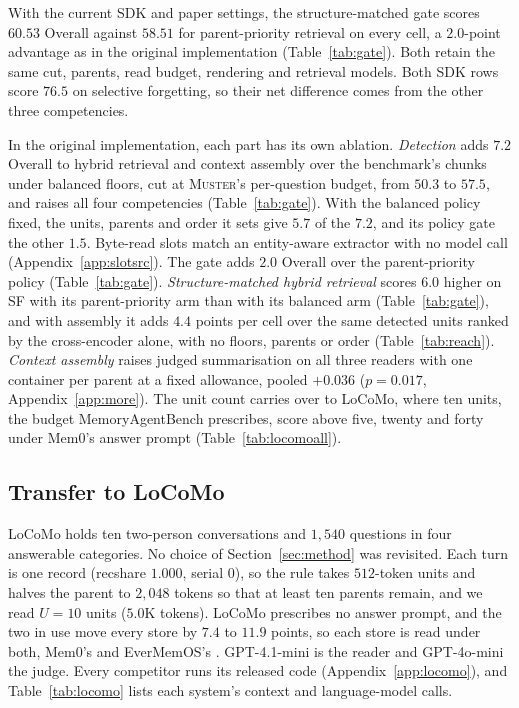 \documentclass{article}
\newcommand{\sys}{\textsc{Muster}}
\newcommand{\serial}{\textsf{serial}}
\newcommand{\cov}{\textsf{recshare}}
\begin{document}
With the current SDK and paper settings, the structure-matched gate scores $60.53$ Overall against $58.51$ for parent-priority retrieval on every cell, a $2.0$-point advantage as in the original implementation (Table~\ref{tab:gate}). Both retain the same cut, parents, read budget, rendering and retrieval models. Both SDK rows score $76.5$ on selective forgetting, so their net difference comes from the other three competencies.

In the original implementation, each part has its own ablation. \emph{Detection} adds $7.2$ Overall to hybrid retrieval and context assembly over the benchmark's chunks under balanced floors, cut at \sys{}'s per-question budget, from $50.3$ to $57.5$, and raises all four competencies (Table~\ref{tab:gate}). With the balanced policy fixed, the units, parents and order it sets give $5.7$ of the $7.2$, and its policy gate the other $1.5$. Byte-read slots match an entity-aware extractor with no model call (Appendix~\ref{app:slotsrc}). The gate adds $2.0$ Overall over the parent-priority policy (Table~\ref{tab:gate}). \emph{Structure-matched hybrid retrieval} scores $6.0$ higher on SF with its parent-priority arm than with its balanced arm (Table~\ref{tab:gate}), and with assembly it adds $4.4$ points per cell over the same detected units ranked by the cross-encoder alone, with no floors, parents or order (Table~\ref{tab:reach}). \emph{Context assembly} raises judged summarisation on all three readers with one container per parent at a fixed allowance, pooled $+0.036$ ($p=0.017$, Appendix~\ref{app:more}). The unit count carries over to LoCoMo, where ten units, the budget MemoryAgentBench prescribes, score above five, twenty and forty under Mem0's answer prompt (Table~\ref{tab:locomoall}).

\subsection{Transfer to LoCoMo}\label{sec:locomo}

LoCoMo \cite{locomo} holds ten two-person conversations and $1{,}540$ questions in four answerable categories. No choice of Section~\ref{sec:method} was revisited. Each turn is one record (\cov{} $1.000$, \serial{} $0$), so the rule takes $512$-token units and halves the parent to $2{,}048$ tokens so that at least ten parents remain, and we read $U{=}10$ units ($5.0$K tokens). LoCoMo prescribes no answer prompt, and the two in use move every store by $7.4$ to $11.9$ points, so each store is read under both, Mem0's \cite{mem0} and EverMemOS's \cite{evermemos}. GPT-4.1-mini \cite{gpt41} is the reader and GPT-4o-mini \cite{gpt4omini} the judge. Every competitor runs its released code (Appendix~\ref{app:locomo}), and Table~\ref{tab:locomo} lists each system's context and language-model calls.
\end{document}
